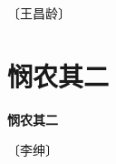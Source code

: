 \documentclass[12pt,UTF-8,openany,fontset=none]{ctexbook}
\begin{document}
\begin{center}
    \vspace{10pt}
    
    \begin{large}
        
        〔王昌龄〕
        
    \end{large}
    
    \vspace{8pt}
    
    \begin{huge}
        
        \phantom{。}

        \phantom{。}
        
        \phantom{。}

        \phantom{。}
        
    \end{huge}
    
\end{center}

\vspace{8pt}
\clearpage


\section{悯农其二}



\begin{center}
    {\bfseries 悯农其二}
\end{center}

\begin{center}
    \vspace{10pt}
    
    \begin{large}
        
        〔李绅〕
        
    \end{large}
    
    \vspace{8pt}
    
    \begin{huge}
        
        \phantom{。}~~

        \phantom{。}
        
        \phantom{。}

        \phantom{。}
        
    \end{huge}
    
\end{center}
\end{document}
